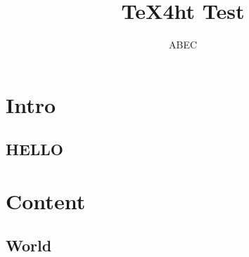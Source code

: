 \documentclass{book}
\title{TeX4ht Test}
\author{ABEC}
\begin{document}
\maketitle

\ifdefined\HCode\else\tableofcontents\fi

\section{Intro}
\subsection{HELLO}

\section{Content}
\subsection{World}
\end{document}
